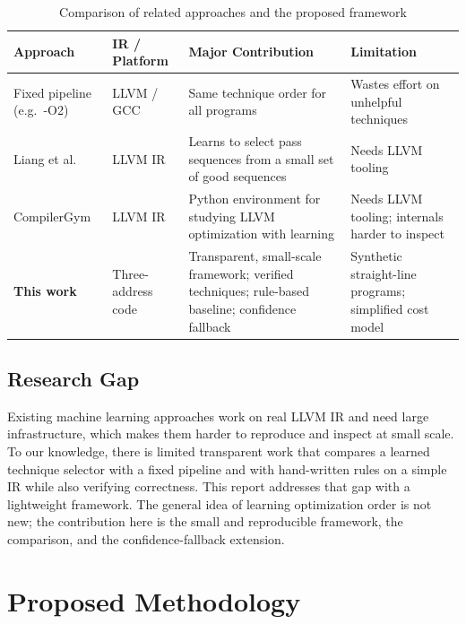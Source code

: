 \documentclass[12pt,a4paper]{article}
\begin{document}
\begin{table}[H]
\centering
\caption{Comparison of related approaches and the proposed framework}
\label{tab:survey}
\small
\begin{tabularx}{\textwidth}{p{2.6cm}p{2.6cm}X p{2.6cm}}
\toprule
\textbf{Approach} & \textbf{IR / Platform} & \textbf{Major Contribution} &
\textbf{Limitation}\\
\midrule
Fixed pipeline (e.g.\ -O2) & LLVM / GCC & Same technique order for all programs & Wastes effort on unhelpful techniques\\
Liang et al. \cite{liang2023} & LLVM IR & Learns to select pass sequences from a small set of good sequences & Needs LLVM tooling\\
CompilerGym \cite{cummins2021} & LLVM IR & Python environment for studying LLVM optimization with learning & Needs LLVM tooling; internals harder to inspect\\
\textbf{This work} & Three-address code & Transparent, small-scale framework; verified techniques; rule-based baseline; confidence fallback & Synthetic straight-line programs; simplified cost model\\
\bottomrule
\end{tabularx}
\end{table}

\subsection{Research Gap}

Existing machine learning approaches work on real LLVM IR and need large infrastructure, which makes them harder to reproduce and inspect at small scale. To our knowledge, there is limited transparent work that compares a learned technique selector with a fixed pipeline and with hand-written rules on a simple IR while also verifying correctness. This report addresses that gap with a lightweight framework. The general idea of learning optimization order is not new; the contribution here is the small and reproducible framework, the comparison, and the confidence-fallback extension.

\newpage

\section{Proposed Methodology}
\end{document}
